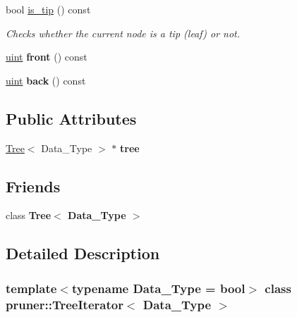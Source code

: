 \begin{DoxyCompactItemize}
bool \hyperlink{classpruner_1_1TreeIterator_a988beb12324abb6c66f0a0f0f917f665}{is\+\_\+tip} () const
\begin{DoxyCompactList}\small\item\em Checks whether the current node is a tip (leaf) or not. \end{DoxyCompactList}\item 
\mbox{\label{classpruner_1_1TreeIterator_acc88b486085d9a4a4f85e4c87bf1a5fc}} 
\hyperlink{namespacepruner_a659e6e64a9e2b8e981c3d34262a2f67e}{uint} {\bfseries front} () const
\item 
\mbox{\label{classpruner_1_1TreeIterator_a1305b8145e6af45414d282562710e1f2}} 
\hyperlink{namespacepruner_a659e6e64a9e2b8e981c3d34262a2f67e}{uint} {\bfseries back} () const
\end{DoxyCompactItemize}
\subsection*{Public Attributes}
\begin{DoxyCompactItemize}
\item 
\mbox{\label{classpruner_1_1TreeIterator_a7408b11f00c754410bb5c236cf363d7b}} 
\hyperlink{classpruner_1_1Tree}{Tree}$<$ Data\+\_\+\+Type $>$ $\ast$ {\bfseries tree}
\end{DoxyCompactItemize}
\subsection*{Friends}
\begin{DoxyCompactItemize}
\item 
\mbox{\label{classpruner_1_1TreeIterator_a3beb724164e5ffbc68d03b553b7610c7}} 
class {\bfseries Tree$<$ Data\+\_\+\+Type $>$}
\end{DoxyCompactItemize}


\subsection{Detailed Description}
\subsubsection*{template$<$typename Data\+\_\+\+Type = bool$>$\newline
class pruner\+::\+Tree\+Iterator$<$ Data\+\_\+\+Type $>$}

